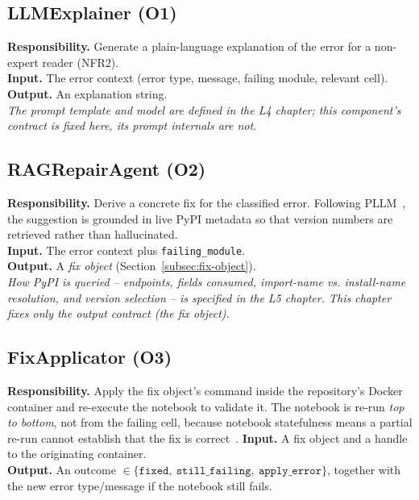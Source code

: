 \subsection{LLMExplainer (O1)}
\label{subsec:llmexplainer}
\textbf{Responsibility.} Generate a plain-language explanation of the
error for a non-expert reader (NFR2).\\
\textbf{Input.} The error context (error type, message, failing module,
relevant cell).\\
\textbf{Output.} An explanation string.\\
\emph{The prompt template and model are defined in the L4 chapter; this
component's contract is fixed here, its prompt internals are not.}

\subsection{RAGRepairAgent (O2)}
\label{subsec:repairagent}
\textbf{Responsibility.} Derive a concrete fix for the classified error.
Following PLLM~\cite{bartlett2025pllm}, %
the suggestion is grounded in live PyPI metadata so that version numbers
are retrieved rather than hallucinated.\\
\textbf{Input.} The error context plus \texttt{failing\_module}.\\
\textbf{Output.} A \emph{fix object} (Section~\ref{subsec:fix-object}).\\
\emph{How PyPI is queried -- endpoints, fields consumed, import-name vs.
install-name resolution, and version selection -- is specified in the L5
chapter. This chapter fixes only the output contract (the fix object).}

\subsection{FixApplicator (O3)}
\label{subsec:fixapplicator}
\textbf{Responsibility.} Apply the fix object's command inside the
repository's Docker container and re-execute the notebook to validate it.
The notebook is re-run \emph{top to bottom}, not from the failing cell,
because notebook statefulness means a partial re-run cannot establish that
the fix is correct~\cite{grotov2024debug}. %
\textbf{Input.} A fix object and a handle to the originating container.\\
\textbf{Output.} An outcome
$\in \{\texttt{fixed},\ \texttt{still\_failing},\ \texttt{apply\_error}\}$,
together with the new error type/message if the notebook still fails.

